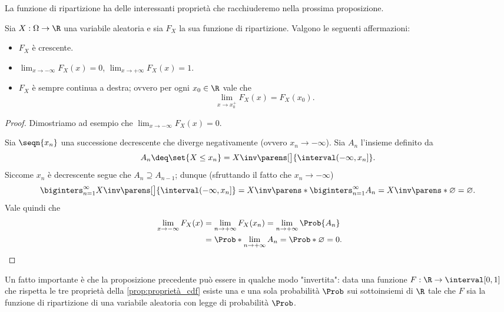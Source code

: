 La funzione di ripartizione ha delle interessanti proprietà che racchiuderemo nella prossima proposizione.
\begin{proposition}
    \label{prop:proprietà_cdf}
    Sia $X : \Omega \to \R$ una variabile aleatoria e sia $F_X$ la sua funzione di ripartizione. Valgono le seguenti affermazioni:
    \begin{itemize}
        \item $F_X$ è crescente.
        \item $\displaystyle\lim_{x \to -\infty} F_X(x) = 0$, $\displaystyle\lim_{x\to +\infty} F_X(x) = 1.$
        \item $F_X$ è sempre continua a destra; ovvero per ogni $x_0 \in \R$ vale che \[
            \lim_{x \to x_0^+} F_X(x) = F_X(x_0).    
        \]
    \end{itemize}
\end{proposition}
\begin{proof}
    Dimostriamo ad esempio che $\displaystyle\lim_{x \to -\infty} F_X(x) = 0$.

    Sia $\seqn{x_n}$ una successione decrescente che diverge negativamente (ovvero $x_n \to -\infty$).
    Sia $A_n$ l'insieme definito da \[
        A_n \deq \set{X \leq x_n} = X\inv\parens[\big]{\interval({-\infty, x_n}]}.
    \] Siccome $x_n$ è decrescente segue che $A_n \supseteq A_{n-1}$; dunque (sfruttando il fatto che $x_n \to -\infty$) \[
        \biginters_{n = 1}^\infty X\inv\parens[\big]{\interval({-\infty, x_n}]}
        =  X\inv\parens*{ \biginters_{n = 1}^\infty A_n }
        = X\inv\parens*{\varnothing}
        = \varnothing.
    \] Vale quindi che \[
        \lim_{x \to -\infty} F_X(x) 
        \begin{alignedat}[t]{1}
            &= \lim_{n \to +\infty} F_X(x_n)
            = \lim_{n \to +\infty} \Prob{A_n}\\
            &= \Prob*{\lim_{n\to +\infty} A_n}
            = \Prob*{\varnothing}
            = 0.    
        \end{alignedat} \tag*{\qedhere}
    \]
\end{proof}

Un fatto importante è che la proposizione precedente può essere in qualche modo "invertita": data una funzione $F : \R \to \interval[{0, 1}]$ che rispetta le tre proprietà della \autoref{prop:proprietà_cdf} esiste una e una sola probabilità $\Prob$ sui sottoinsiemi di $\R$ tale che $F$ sia la funzione di ripartizione di una variabile aleatoria con legge di probabilità $\Prob$.

